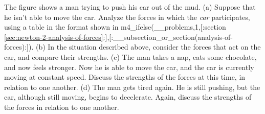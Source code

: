 The figure shows a man trying to push his car out of the mud. (a) Suppose that he isn't
able to move the car. Analyze the forces in which the \emph{car} participates,
using a table in the format shown in m4_ifelse(__problems,1,[:section \ref{sec:newton-2-analysis-of-forces}:],[:__subsection_or_section(analysis-of-forces):]).
(b) In the situation described above, consider the forces that act on the car,
and compare their strengths.
(c) The man takes a nap, eats some chocolate, and now feels stronger. Now he is
able to move the car, and the car is currently
moving at constant speed. Discuss the strengths of the forces at this time, in relation to one
another.
(d) The man gets tired again. He is still pushing, but the car, although still moving, begins to decelerate.
Again, discuss the strengths of the forces in relation to one another.
